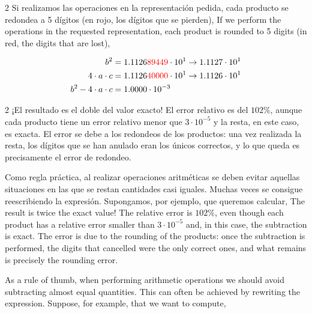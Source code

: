 \begin{paracol}{2}
Si realizamos las operaciones en la representación pedida, cada producto se redondea a 5 dígitos (en rojo, los dígitos que se pierden),
\switchcolumn
If we perform the operations in the requested representation, each product is rounded to 5 digits (in red, the digits that are lost),
\end{paracol}
\begin{align*}
b^2&=1.1126{\color{red}89449}\cdot10^1\rightarrow 1.1127\cdot10^1\\
4\cdot a\cdot c&=1.1126{\color{red}40000}\cdot10^1\rightarrow 1.1126\cdot10^1\\
b^2-4\cdot a\cdot c&=1.0000\cdot10^{-3}
\end{align*}
\begin{paracol}{2}
¡El resultado es el doble del valor exacto! El error relativo es del $102\%$, aunque cada producto tiene un error relativo menor que $3\cdot10^{-5}$ y la resta, en este caso, es exacta. El error se debe a los redondeos de los productos: una vez realizada la resta, los dígitos que se han anulado eran los únicos correctos, y lo que queda es precisamente el error de redondeo.

Como regla práctica, al realizar operaciones aritméticas se deben evitar aquellas situaciones en las que se restan cantidades casi iguales. Muchas veces se consigue reescribiendo la expresión. Supongamos, por ejemplo, que queremos calcular,
\switchcolumn
The result is twice the exact value! The relative error is $102\%$, even though each product has a relative error smaller than $3\cdot10^{-5}$ and, in this case, the subtraction is exact. The error is due to the rounding of the products: once the subtraction is performed, the digits that cancelled were the only correct ones, and what remains is precisely the rounding error.

As a rule of thumb, when performing arithmetic operations we should avoid subtracting almost equal quantities. This can often be achieved by rewriting the expression. Suppose, for example, that we want to compute,
\end{paracol}

